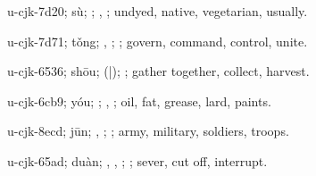 \begin{multicols}{2}
{\cjkgGlue{}u-cjk-7d20; sù; \cjkgGlue{}; \cjkgGlue{}, \cjkgGlue{}; undyed, native, vegetarian, usually.

\cjkgGlue{}u-cjk-7d71; tǒng; \cjkgGlue{}\cjkgGlue{}\cjkgGlue{}, \cjkgGlue{}\cjkgGlue{}\cjkgGlue{}; \cjkgGlue{}; govern, command, control, unite.

\cjkgGlue{}u-cjk-6536; shōu; \cjkgGlue{}\cjkgGlue{}(\cjkgGlue{}|\cjkgGlue{}); \cjkgGlue{}; gather together, collect, harvest.

\cjkgGlue{}u-cjk-6cb9; yóu; \cjkgGlue{}; \cjkgGlue{}, \cjkgGlue{}; oil, fat, grease, lard, paints.

\cjkgGlue{}u-cjk-8ecd; jūn; \cjkgGlue{}, \cjkgGlue{}; \cjkgGlue{}; army, military, soldiers, troops.

\cjkgGlue{}u-cjk-65ad; duàn; \cjkgGlue{}\cjkgGlue{}\cjkgGlue{}, \cjkgGlue{}\cjkgGlue{}\cjkgGlue{}, \cjkgGlue{}\cjkgGlue{}\cjkgGlue{}; \cjkgGlue{}; sever, cut off, interrupt.

}
\end{multicols}
